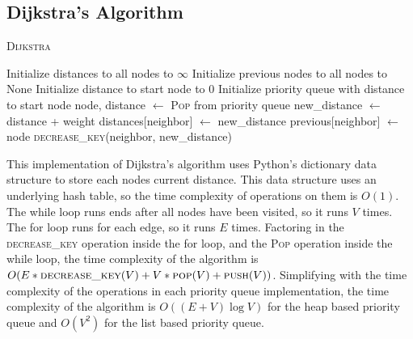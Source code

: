 \documentclass[12pt]{article}
\begin{document}
\subsection{Dijkstra's Algorithm}

\begin{algorithm}[H]
    \caption{\textsc{Dijkstra}}
    \begin{algorithmic}[1]
        \State Initialize distances to all nodes to $\infty$ 
        \State Initialize previous nodes to all nodes to None 
        \State Initialize distance to start node to 0
        \State Initialize priority queue with distance to start node 
         
            \State node, distance $\gets$ \textsc{Pop} from priority queue 
             
                \State new\_distance $\gets$ distance + weight
                    \State distances[neighbor] $\gets$ new\_distance
                    \State previous[neighbor] $\gets$ node
                    \State \textsc{decrease\_key}(neighbor, new\_distance) 
                \EndIf
            \EndFor
        \EndWhile

    \end{algorithmic}
\end{algorithm}

This implementation of Dijkstra's algorithm uses Python's dictionary data
structure to store each nodes current distance. This data structure
uses an underlying hash table, so the time complexity of operations on them is
$O(1)$. The while loop runs ends after all nodes have been visited, so it runs
$V$ times. The for loop runs for each edge, so it runs $E$ times. Factoring in
the \textsc{decrease\_key} operation inside the for loop, and the \textsc{Pop} operation
inside the while loop, the time complexity of the algorithm is $O(E * \textsc{decrease\_key}(V)
 + V * \textsc{pop}(V) + \textsc{push}(V))$. Simplifying with the time complexity
of the operations in each priority queue implementation, the time complexity of
the algorithm is $O((E+V)\log V)$ for the heap based priority queue and $O(V^2)$
for the list based priority queue.
\end{document}
